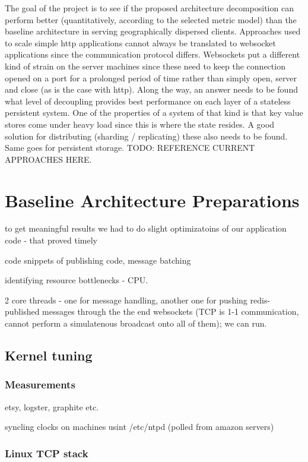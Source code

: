 \documentclass{uvamscse}
\begin{document}
The goal of the project is to see if the proposed architecture decomposition can perform better (quantitatively, according to the selected metric model) than the baseline architecture in serving geographically dispersed clients. Approaches used to scale simple http applications cannot always be translated to websocket applications since the communication protocol differs. Websockets put a different kind of strain on the server machines since these need to keep the connection opened on a port for a prolonged period of time rather than simply open, server and close (as is the case with http). Along the way, an answer needs to be found what level of decoupling provides best performance on each layer of a stateless persistent system. One of the properties of a system of that kind is that key value stores come under heavy load since this is where the state resides. A good solution for distributing (sharding / replicating) these also needs to be found. Same goes for persistent storage.
TODO: REFERENCE CURRENT APPROACHES HERE.

\section{Baseline Architecture Preparations}\label{Baseline Architecture}
to get meaningful results we had to do slight optimizatoins of our application code - that proved timely

code snippets of publishing code, message batching

identifying resource bottlenecks - CPU.

2 core threads - one for message handling, another one for pushing redis-published messages through the the end websockets (TCP is 1-1 communication, cannot perform a simulatenous broadcast onto all of them); we can run.

\subsection{Kernel tuning}\label{Kernel tuning}

\subsubsection{Measurements}
etsy, logster, graphite etc.

syncling clocks on machines usint /etc/ntpd (polled from amazon servers)

\subsubsection{Linux TCP stack}
\end{document}
